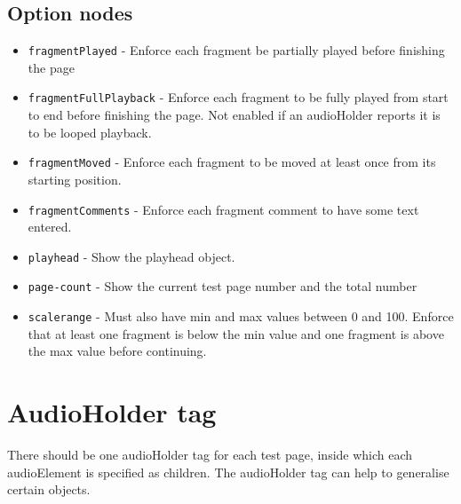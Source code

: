 \documentclass{article}
\begin{document}
\subsection{Option nodes}

\begin{itemize}
\item \texttt{fragmentPlayed} - Enforce each fragment be partially played before finishing the page
\item \texttt{fragmentFullPlayback} - Enforce each fragment to be fully played from start to end before finishing the page. Not enabled if an audioHolder reports it is to be looped playback.
\item \texttt{fragmentMoved} - Enforce each fragment to be moved at least once from its starting position.
\item \texttt{fragmentComments} - Enforce each fragment comment to have some text entered.
\item \texttt{playhead} - Show the playhead object.
\item \texttt{page-count} - Show the current test page number and the total number
\item \texttt{scalerange} - Must also have min and max values between 0 and 100. Enforce that at least one fragment is below the min value and one fragment is above the max value before continuing.
\end{itemize}

\section{AudioHolder tag}

There should be one audioHolder tag for each test page, inside which each audioElement is specified as children. The audioHolder tag can help to generalise certain objects. 
\end{document}
